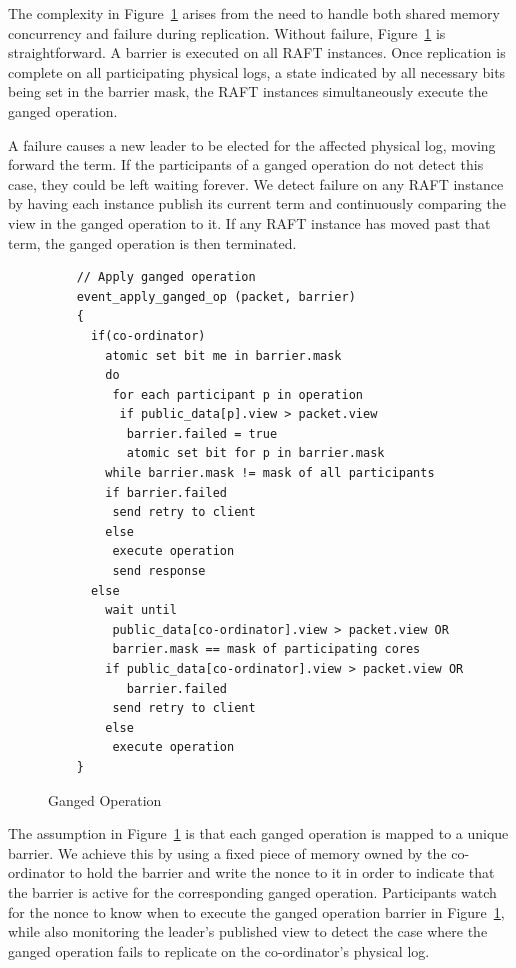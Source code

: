 \documentclass[letterpaper,twocolumn,10pt]{article}
\begin{document}
The complexity in Figure~\ref{fig:ganged_ops} arises from the need to handle
both shared memory concurrency and failure during replication. Without failure,
Figure~\ref{fig:ganged_ops} is straightforward. A barrier is executed on all
RAFT instances. Once replication is complete on all participating physical logs,
a state indicated by all necessary bits being set in the barrier mask, the RAFT
instances simultaneously execute the ganged operation.

A failure causes a new leader to be elected for the affected physical log,
moving forward the term. If the participants of a ganged operation do not
detect this case, they could be left waiting forever. We detect failure on any
RAFT instance by having each instance publish its current term and continuously
comparing the view in the ganged operation to it. If any RAFT instance has moved
past that term, the ganged operation is then terminated.

\begin{figure}
  \centering
  \scriptsize
  \bf
\begin{verbatim}
    // Apply ganged operation
    event_apply_ganged_op (packet, barrier)
    {
      if(co-ordinator)
        atomic set bit me in barrier.mask         
        do
         for each participant p in operation
          if public_data[p].view > packet.view
           barrier.failed = true 
           atomic set bit for p in barrier.mask
        while barrier.mask != mask of all participants
        if barrier.failed
         send retry to client
        else       
         execute operation
         send response
      else
        wait until 
         public_data[co-ordinator].view > packet.view OR
         barrier.mask == mask of participating cores
        if public_data[co-ordinator].view > packet.view OR
           barrier.failed
         send retry to client
        else
         execute operation
    }
\end{verbatim}
\caption{Ganged Operation}
\label{fig:ganged_ops}
\end{figure}

The assumption in Figure~\ref{fig:ganged_ops} is that each ganged operation is
mapped to a unique barrier. We achieve this by using a fixed piece of memory
owned by the co-ordinator to hold the barrier and write the nonce to it in order
to indicate that the barrier is active for the corresponding ganged
operation. Participants watch for the nonce to know when to execute the
ganged operation barrier in Figure~\ref{fig:ganged_ops}, while also monitoring
the leader's published view to detect the case where the ganged operation fails
to replicate on the co-ordinator's physical log.
\end{document}
